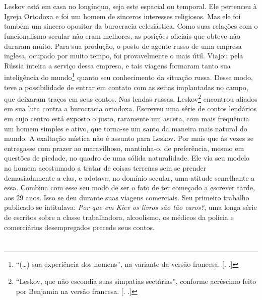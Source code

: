 \section{}

Leskov está em casa no longínquo, seja este espacial ou temporal. Ele
pertenceu à Igreja Ortodoxa e foi um homem de sinceros interesses
religiosos. Mas ele foi também um sincero opositor da burocracia
eclesiástica. Como suas relações com o funcionalismo secular não eram
melhores, as posições oficiais que obteve não duraram muito. Para sua
produção, o posto de agente russo de uma empresa inglesa, ocupado
por muito tempo, foi provavelmente o mais útil. Viajou pela Rússia
inteira a serviço dessa empresa, e tais viagens formaram tanto sua
inteligência do mundo\footnote{``(\ldots{}) sua experiência dos homens'', na
  variante da versão francesa. [. .]} quanto seu conhecimento
da situação russa. Desse modo, teve a possibilidade de entrar em contato
com as seitas implantadas no campo, que deixaram traços em seus contos.
Nas lendas russas, Leskov\footnote{``Leskov, que não escondia suas
  simpatias sectárias'', conforme acréscimo feito por Benjamin na
  versão francesa. [. .]} encontrou aliados em sua luta contra
a burocracia ortodoxa. Escreveu uma série de contos lendários em cujo
centro está exposto o justo, raramente um asceta, com mais frequência um
homem simples e ativo, que torna-se um santo da maneira mais natural do
mundo. A exaltação mística não é assunto para Leskov. Por mais que às
vezes se entregasse com prazer ao maravilhoso, mantinha-o, de
preferência, mesmo em questões de piedade, no quadro de uma sólida
naturalidade. Ele via seu modelo no homem acostumado a tratar de coisas
terrenas sem se prender demasiadamente a elas, e adotava, no domínio
secular, uma atitude semelhante a essa. Combina com esse seu modo de ser
o fato de ter começado a escrever tarde, aos 29 anos. Isso se deu durante
suas viagens comerciais. Seu primeiro trabalho publicado se intitulava:
\emph{Por que em Kiev os livros são tão caros?}, uma longa série de escritos
sobre a classe trabalhadora, alcoolismo, os médicos da
polícia e comerciários desempregados precede seus contos.

\section{}

